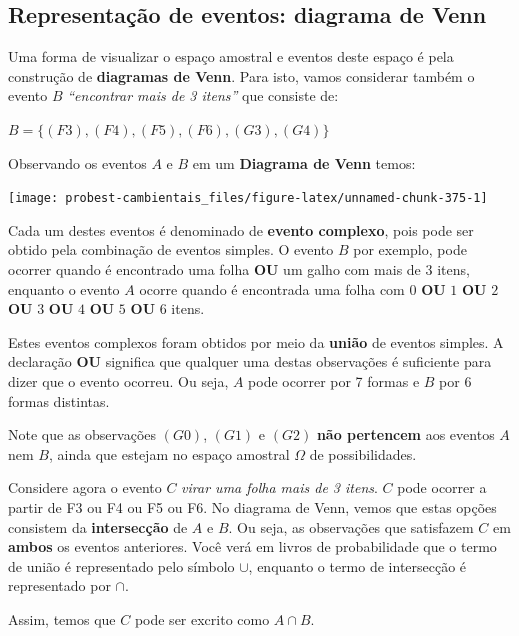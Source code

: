 \documentclass[
]{book}
\begin{document}
\hypertarget{representauxe7uxe3o-de-eventos-diagrama-de-venn}{%
\subsection{Representação de eventos: diagrama de Venn}\label{representauxe7uxe3o-de-eventos-diagrama-de-venn}}

Uma forma de visualizar o espaço amostral e eventos deste espaço é pela construção de \textbf{diagramas de Venn}. Para isto, vamos considerar também o evento \(B\) \emph{``encontrar mais de 3 itens''} que consiste de:

\(B = \{(F3), (F4), (F5), (F6), (G3), (G4)\}\)

Observando os eventos \(A\) e \(B\) em um \textbf{Diagrama de Venn} temos:

\begin{center}\texttt{[image: probest-cambientais\_files/figure-latex/unnamed-chunk-375-1]} \end{center}

Cada um destes eventos é denominado de \textbf{evento complexo}, pois pode ser obtido pela combinação de eventos simples. O evento \(B\) por exemplo, pode ocorrer quando é encontrado uma folha \textbf{OU} um galho com mais de 3 itens, enquanto o evento \(A\) ocorre quando é encontrada uma folha com \(0\) \textbf{OU} \(1\) \textbf{OU} \(2\) \textbf{OU} \(3\) \textbf{OU} \(4\) \textbf{OU} \(5\) \textbf{OU} \(6\) itens.

Estes eventos complexos foram obtidos por meio da \textbf{união} de eventos simples. A declaração \textbf{OU} significa que qualquer uma destas observações é suficiente para dizer que o evento ocorreu. Ou seja, \(A\) pode ocorrer por 7 formas e \(B\) por 6 formas distintas.

Note que as observações \((G0)\), \((G1)\) e \((G2)\) \textbf{não pertencem} aos eventos \(A\) nem \(B\), ainda que estejam no espaço amostral \(\Omega\) de possibilidades.

Considere agora o evento \(C\) \emph{virar uma folha mais de 3 itens}. \(C\) pode ocorrer a partir de F3 ou F4 ou F5 ou F6. No diagrama de Venn, vemos que estas opções consistem da \textbf{intersecção} de \(A\) e \(B\). Ou seja, as observações que satisfazem \(C\) em \textbf{ambos} os eventos anteriores. Você verá em livros de probabilidade que o termo de união é representado pelo símbolo \(\cup\), enquanto o termo de intersecção é representado por \(\cap\).

Assim, temos que \(C\) pode ser excrito como \(A \cap B\).
\end{document}
